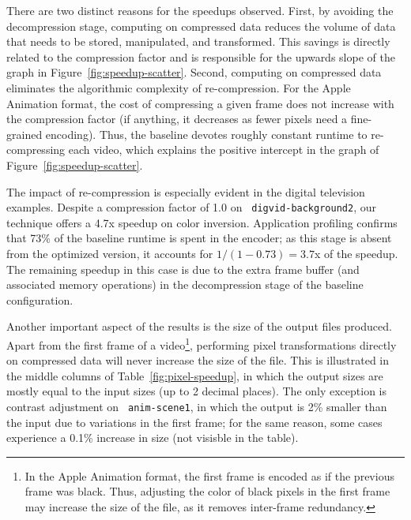 There are two distinct reasons for the speedups observed.  First, by
avoiding the decompression stage, computing on compressed data reduces
the volume of data that needs to be stored, manipulated, and
transformed.  This savings is directly related to the compression
factor and is responsible for the upwards slope of the graph in
Figure~\ref{fig:speedup-scatter}.  Second, computing on compressed
data eliminates the algorithmic complexity of re-compression.  For the
Apple Animation format, the cost of compressing a given frame does not
increase with the compression factor (if anything, it decreases as
fewer pixels need a fine-grained encoding).  Thus, the baseline
devotes roughly constant runtime to re-compressing each video, which
explains the positive intercept in the graph of
Figure~\ref{fig:speedup-scatter}.

The impact of re-compression is especially evident in the digital
television examples.  Despite a compression factor of 1.0 on {\tt
digvid-background2}, our technique offers a 4.7x speedup on color
inversion.  Application profiling confirms that 
73\% of the baseline runtime is spent in the encoder; as this stage is
absent from the optimized version, it accounts for $1/(1-0.73) = 3.7$x
of the speedup.  The remaining speedup in this case is due to the
extra frame buffer (and associated memory operations) in the
decompression stage of the baseline configuration.
%
%

Another important aspect of the results is the size of the output
files produced.  Apart from the first frame of a video\footnote{In the
Apple Animation format, the first frame is encoded as if the previous
frame was black.  Thus, adjusting the color of black pixels in the
first frame may increase the size of the file, as it removes
inter-frame redundancy.}, performing pixel transformations directly on
compressed data will never increase the size of the file.  This is
illustrated in the middle columns of Table~\ref{fig:pixel-speedup}, in
which the output sizes are mostly equal to the input sizes (up to 2
decimal places).  The only exception is contrast adjustment on {\tt
anim-scene1}, in which the output is 2\% smaller than the input due to
variations in the first frame; for the same reason, some cases
experience a 0.1\% increase in size (not visisble in the table).

